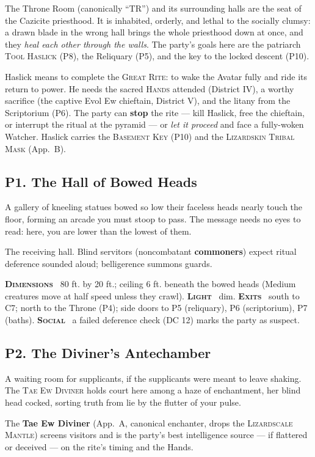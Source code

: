 \documentclass[10pt,twoside]{article}
\newcommand{\tech}[1]{\textbf{\scshape\textcolor{stone}{#1}}\ }
\newcommand{\eqname}[1]{\textsc{#1}}
\begin{document}
The Throne Room (canonically ``TR'') and its surrounding halls are the seat of the
Cazicite priesthood. It is inhabited, orderly, and lethal to the socially clumsy: a
drawn blade in the wrong hall brings the whole priesthood down at once, and they
\emph{heal each other through the walls}. The party's goals here are the patriarch
\eqname{Tool Haslick} (P8), the Reliquary (P5), and the key to the locked descent
(P10).

\begin{dmnote}
Haslick means to complete the \eqname{Great Rite}: to wake the Avatar fully and ride
its return to power. He needs the sacred \eqname{Hands} attended (District IV), a
worthy sacrifice (the captive Evol Ew chieftain, District V), and the litany from the
Scriptorium (P6). The party can \textbf{stop} the rite --- kill Haslick, free the
chieftain, or interrupt the ritual at the pyramid --- or \emph{let it proceed} and
face a fully-woken Watcher. Haslick carries the \eqname{Basement Key} (P10) and the
\eqname{Lizardskin Tribal Mask} (App.\ B).
\end{dmnote}

\subsection{P1. The Hall of Bowed Heads}
\begin{readaloud}
A gallery of kneeling statues bowed so low their faceless heads nearly touch the
floor, forming an arcade you must stoop to pass. The message needs no eyes to read:
here, you are lower than the lowest of them.
\end{readaloud}
The receiving hall. Blind servitors (noncombatant \textbf{commoners}) expect ritual
deference sounded aloud; belligerence summons guards.

\begin{techbox}
\tech{Dimensions} 80 ft. by 20 ft.; ceiling 6 ft. beneath the bowed heads (Medium
creatures move at half speed unless they crawl). \tech{Light} dim. \tech{Exits} south
to C7; north to the Throne (P4); side doors to P5 (reliquary), P6 (scriptorium),
P7 (baths). \tech{Social} a failed deference check (DC 12) marks the party as suspect.
\end{techbox}

\subsection{P2. The Diviner's Antechamber}
\begin{readaloud}
A waiting room for supplicants, if the supplicants were meant to leave shaking. The
\eqname{Tae Ew Diviner} holds court here among a haze of enchantment, her blind head
cocked, sorting truth from lie by the flutter of your pulse.
\end{readaloud}
The \textbf{Tae Ew Diviner} (App.\ A, canonical enchanter, drops the
\eqname{Lizardscale Mantle}) screens visitors and is the party's best
intelligence source --- if flattered or deceived --- on the rite's timing and the
Hands.
\end{document}
